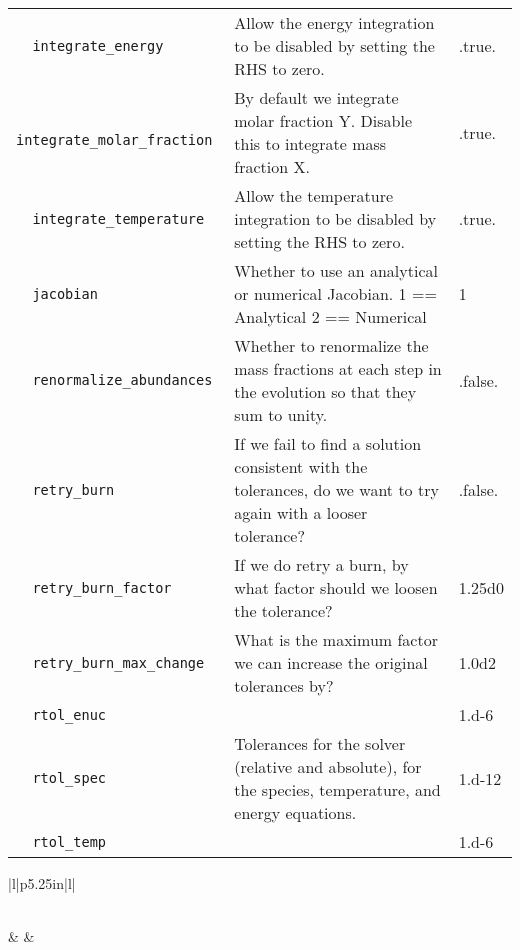 \begin{landscape}
{\begin{center}
\begin{longtable}{|l|p{5.25in}|l|}
\verb=  integrate_energy  = &   Allow the energy integration to be disabled by setting the RHS to zero.  &  .true. \\
\rowcolor{tableShade}
\verb=  integrate_molar_fraction  = &   By default we integrate molar fraction Y. Disable this to integrate mass fraction X.  &  .true. \\
\verb=  integrate_temperature  = &   Allow the temperature integration to be disabled by setting the RHS to zero.  &  .true. \\
\rowcolor{tableShade}
\verb=  jacobian  = &   Whether to use an analytical or numerical Jacobian. 1 == Analytical 2 == Numerical  &  1 \\
\verb=  renormalize_abundances  = &   Whether to renormalize the mass fractions at each step in the evolution so that they sum to unity.  &  .false. \\
\rowcolor{tableShade}
\verb=  retry_burn  = &   If we fail to find a solution consistent with the tolerances, do we want to try again with a looser tolerance?  &  .false. \\
\verb=  retry_burn_factor  = &   If we do retry a burn, by what factor should we loosen the tolerance?  &  1.25d0 \\
\rowcolor{tableShade}
\verb=  retry_burn_max_change  = &   What is the maximum factor we can increase the original tolerances by?  &  1.0d2 \\
\verb=  rtol_enuc  = &    &  1.d-6 \\
\rowcolor{tableShade}
\verb=  rtol_spec  = &   Tolerances for the solver (relative and absolute), for the species, temperature, and energy equations.  &  1.d-12 \\
\verb=  rtol_temp  = &    &  1.d-6 \\


\end{longtable}
\end{center}

} %


{\small

\renewcommand{\arraystretch}{1.5}
%
\begin{center}
\begin{longtable}{|l|p{5.25in}|l|}
\caption[multigamma parameters.]{multigamma parameters.} \label{table: multigamma runtime} \\
%
\hline {} & 
        & 
        \\ \hline 
\endfirsthead


\end{longtable}
\end{center}}
\end{landscape}
